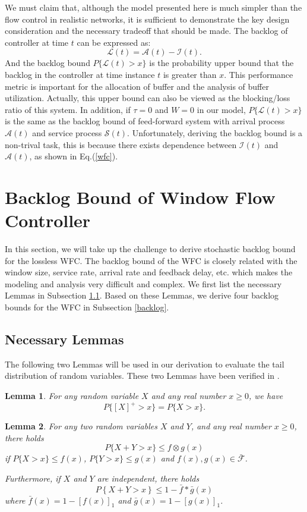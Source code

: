 \documentclass[paper]{ieice}
\newtheorem{lemma}{Lemma}
\begin{document}
We must claim that, although the model presented here is much simpler than the flow control in realistic networks, it is sufficient to demonstrate the key design consideration and the necessary tradeoff that should be made. The backlog of controller at time $t$ can be expressed as:
$$\mathcal{L}(t)=\mathcal{A}(t)-\mathcal{I}(t).$$
And the backlog bound $P\{\mathcal{L}(t)>x\}$ is the probability upper bound that the backlog in the controller at time instance $t$ is greater than $x$. This performance metric is important for the allocation of buffer and the analysis of buffer utilization. Actually, this upper bound can also be viewed as the blocking/loss ratio of this system. In addition, if $\tau=0$ and $W=0$ in our model, $P\{\mathcal{L}(t)>x\}$ is the same as the backlog bound of feed-forward system with arrival process $\mathcal{A}(t)$ and service process $\mathcal{S}(t)$. Unfortunately, deriving the backlog bound is a non-trival task, this is because there exists dependence between $\mathcal{I}(t)$ and $\mathcal{A}(t)$, as shown in Eq.(\ref{wfc}).

\section{Backlog Bound of Window Flow Controller}\label{sncloss}
In this section, we will take up the challenge to derive stochastic backlog bound for the lossless WFC. The backlog bound of the WFC is closely related with the window size, service rate, arrival rate and feedback delay, etc. which makes the modeling and analysis very difficult and complex. We first list the necessary Lemmas in Subsection \ref{neclemma}. Based on these Lemmas, we derive four backlog bounds for the WFC in Subsection \ref{backlog}.
\subsection{Necessary Lemmas}\label{neclemma}
The following two Lemmas will be used in our derivation to evaluate the tail distribution of random variables. These two Lemmas have been verified in \cite{jiang2006basic}.
\begin{lemma}\label{lamma1}
For any random variable $X$ and any real number $x\geq 0$, we have $$P\{[X]^+>x\}=P\{X>x\}.$$
\end{lemma}

\begin{lemma}\label{lamma3}
For any two random variables $X$ and $Y$, and any real number $x\geq 0$, there holds
$$P\{X+Y>x\}\leq f\otimes g(x)$$
if $P\{X>x\}\leq f(x)$, $P\{Y>x\}\leq g(x)$ and $f(x),g(x)\in\bar{\mathcal{F}}$.

Furthermore, if $X$ and $Y$ are independent, there holds
$$P\left\{X+Y>x\right\}\leq 1-\bar{f}\ast\bar{g}(x)$$
where $\bar{f}(x)=1-[f(x)]_1$ and $\bar{g}(x)=1-[g(x)]_1$.
\end{lemma}
\end{document}
